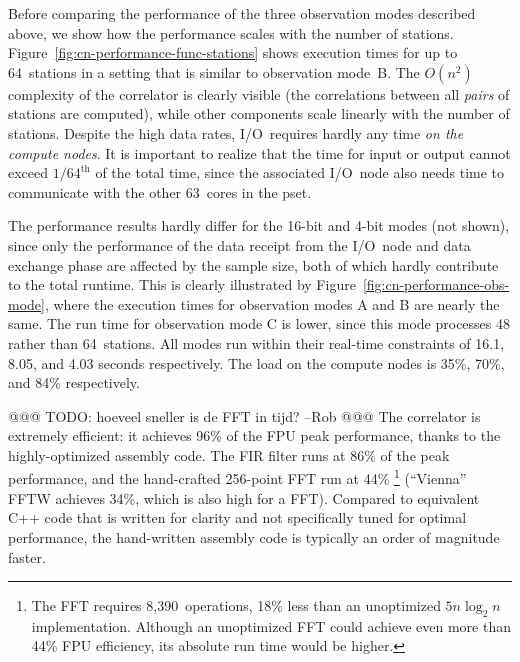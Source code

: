 \documentclass{sig-alternate}
\begin{document}
Before comparing the performance of the three observation modes described
above, we show how the performance scales with the number of stations.
Figure~\ref{fig:cn-performance-func-stations} shows execution times for up to
64~stations in a setting that is similar to observation mode~\textsf{B}.
The $O(n^2)$ complexity of the correlator is clearly visible (the correlations
between all \emph{pairs\/} of stations are computed), while other
components scale linearly with the number of stations.
Despite the high data rates, I/O~requires hardly any time \emph{on the compute nodes}.
It is important to realize that the time for input or output cannot exceed $1/64^\mathrm{th}$
of the total time, since the associated I/O~node also needs time to communicate
with the other 63~cores in the pset.


The performance results hardly differ for the 16-bit and 4-bit modes (not shown),
since only the performance of the data receipt from the I/O~node and data
exchange phase are affected by the sample size, 
both of which hardly contribute to the total runtime.
This is clearly illustrated by Figure~\ref{fig:cn-performance-obs-mode},
where the execution times for observation modes \textsf{A} and \textsf{B}
are nearly the same.
The run time for observation mode \textsf{C} is lower, since this mode
processes 48 rather than 64~stations.
All modes run within their real-time constraints of 16.1, 8.05, and 4.03
seconds respectively.
The load on the compute nodes is 35\%, 70\%, and 84\% respectively.

@@@ TODO: hoeveel sneller is de FFT in tijd? --Rob @@@
The correlator is extremely efficient: it achieves 96\% of the FPU peak
performance, thanks to the highly-optimized assembly code.
The FIR filter runs at 86\% of the peak performance, and the hand-crafted
256-point FFT run at 44\%%
\footnote{The FFT requires 8,390~operations, 18\% less than an unoptimized
$5n \log_2 n$ implementation.  Although an unoptimized FFT could achieve even
more than 44\% FPU efficiency, its absolute run time would be higher.}
(``Vienna'' FFTW achieves 34\%, which is also high for a FFT).
Compared to equivalent C++ code that is written for clarity and not
specifically tuned for optimal performance, the hand-written assembly code is
typically an order of magnitude faster.
\end{document}
